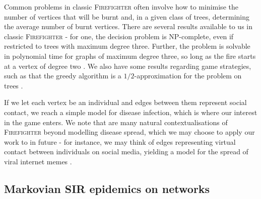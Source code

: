 \documentclass[../report.tex]{subfiles}
\begin{document}
\begin{center}
\noindent{}%
\end{center}

Common problems in classic {\scshape Firefighter} often involve how to minimise the number of vertices that will be burnt and, in a given class of trees, determining the average number of burnt vertices. There are several results available to us in classic {\scshape Firefighter} - for one, the decision problem is NP-complete, even if restricted to trees with maximum degree three. Further, the problem is solvable in polynomial time for graphs of maximum degree three, so long as the fire starts at a vertex of degree two \cite{finbow_2009}. We also have some results regarding game strategies, such as that the greedy algorithm is a $1/2$-approximation for the problem on trees \cite{finbow_2009}.

If we let each vertex be an individual and edges between them represent social contact, we reach a simple model for disease infection, which is where our interest in the game enters. We note that are many natural contextualisations of {\scshape Firefighter} beyond modelling disease spread, which we may choose to apply our work to in future - for instance, we may think of edges representing virtual contact between individuals on social media, yielding a model for the spread of viral internet memes \cite{obrien_2019}.


\subsection{Markovian SIR epidemics on networks}
\label{subsec:SIR-lit}
\end{document}
